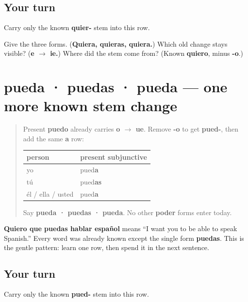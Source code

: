 \subsection*{Your turn}
Carry only the known \textbf{quier-} stem into this row.

\begin{tcolorbox}[breakable,colback=teal!4,colframe=teal!35!black,title={Before you move on}]
Give the three forms. (\textbf{Quiera, quieras, quiera.}) Which old change stays visible? (\textbf{e $\to$ ie.}) Where did the stem come from? (Known \textbf{quiero}, minus \textbf{-o}.)
\end{tcolorbox}
\section[pueda · puedas · pueda]{pueda · puedas · pueda — one more known stem change}

\label{lesson:ES-C18-poder-subjuntivo}



\begin{quote}
Present \textbf{puedo} already carries \textbf{o $\to$ ue}. Remove \textbf{-o} to get \textbf{pued-}, then add the same \textbf{a} row:

\noindent
\begin{tabularx}{\linewidth}{@{}>{\raggedright\arraybackslash}X>{\raggedright\arraybackslash}X@{}}
\toprule
\textbf{person} & \textbf{present subjunctive} \\
\midrule
yo & pued\textbf{a} \\
tú & pued\textbf{as} \\
él / ella / usted & pued\textbf{a} \\
\bottomrule
\end{tabularx}

Say \textbf{pueda · puedas · pueda}. No other \textbf{poder} forms enter today.
\end{quote}

\begin{grammarlens}[title={Grammar Lens: use it immediately}]
\textbf{Quiero que puedas hablar español} means “I want you to be able to speak Spanish.” Every word was already known except the single form \textbf{puedas}. This is the gentle pattern: learn one row, then spend it in the next sentence.
\end{grammarlens}

\subsection*{Your turn}
Carry only the known \textbf{pued-} stem into this row.

